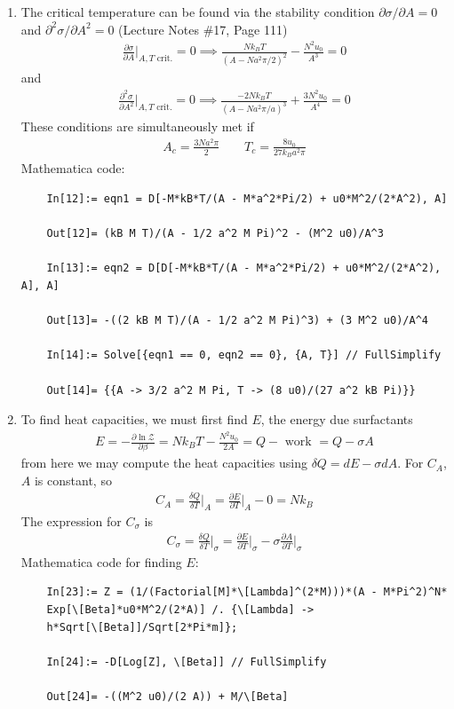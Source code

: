 \documentclass{article}
\theoremstyle{definition}
\newcommand{\p}{\partial}
\newcommand{\be}{\beta}
\newcommand{\f}[2]{\frac{#1}{#2}}
\newcommand{\lp}{\left(}
\newcommand{\rp}{\right)}
\begin{document}
\begin{enumerate}[label=(\alph*)]
	
	
	\item The critical temperature can be found via the stability condition $\p \sigma / \p A = 0$ and $\p^2 \sigma/ \p A^2 = 0$ (Lecture Notes \#17, Page 111)
	\begin{align*}
	\f{\p \sigma}{\p A}\bigg\vert_{A,T \text{ crit.}} = 0 \implies \f{N k_B T}{ \lp A - N a^2 \pi/2 \rp^2} - \f{N^2 u_0}{A^3} = 0
	\end{align*}
	and 
	\begin{align*}
	\f{\p^2 \sigma}{\p A^2}\bigg\vert_{A,T \text{ crit.}}  = 0 \implies \f{-2 N k_BT}{ \lp A -  N a^2 \pi/a \rp^3} + \f{3 N^2 u_0}{A^4} = 0 
	\end{align*}
	These conditions are simultaneously met if 
	\begin{align*}
	\boxed{A_c = \f{3N a^2 \pi}{2} \quad\quad T_c = \f{8 u_0}{27 k_B a^2 \pi} }
	\end{align*}
	Mathematica code:
	\begin{lstlisting}
	In[12]:= eqn1 = D[-M*kB*T/(A - M*a^2*Pi/2) + u0*M^2/(2*A^2), A]
	
	Out[12]= (kB M T)/(A - 1/2 a^2 M Pi)^2 - (M^2 u0)/A^3
	
	In[13]:= eqn2 = D[D[-M*kB*T/(A - M*a^2*Pi/2) + u0*M^2/(2*A^2), A], A]
	
	Out[13]= -((2 kB M T)/(A - 1/2 a^2 M Pi)^3) + (3 M^2 u0)/A^4
	
	In[14]:= Solve[{eqn1 == 0, eqn2 == 0}, {A, T}] // FullSimplify
	
	Out[14]= {{A -> 3/2 a^2 M Pi, T -> (8 u0)/(27 a^2 kB Pi)}}
	\end{lstlisting}
	
	
	
	\item To find heat capacities, we must first find $E$, the energy due surfactants
	\begin{align*}
	E = -\f{\p \ln \mathcal{Z}}{\p \be} = N k_B T - \f{N^2 u_0}{2A} = Q - \text{ work } = Q - \sigma A 
	\end{align*}
	from here we may compute the heat capacities using $\delta Q = d E - \sigma d A$. For $C_A$, $A$ is constant, so
	\begin{align*}
	\boxed{C_A = \f{\delta Q}{\delta T}\bigg\vert_{A}  = \f{\p E}{\p T}\bigg\vert_{A} - 0  = N k_B}
	\end{align*}
	The expression for $C_\sigma$ is 
	\begin{align*}
	\boxed{C_\sigma = \f{\delta Q}{ \delta T}\bigg\vert_{\sigma} = \f{\p E}{\p T}\bigg\vert_\sigma - \sigma \f{\p A}{\p T}\bigg\vert_{\sigma}}
	\end{align*}
	Mathematica code for finding $E$:
	\begin{lstlisting}
	In[23]:= Z = (1/(Factorial[M]*\[Lambda]^(2*M)))*(A - M*Pi^2)^N*
	Exp[\[Beta]*u0*M^2/(2*A)] /. {\[Lambda] -> 
	h*Sqrt[\[Beta]]/Sqrt[2*Pi*m]};
	
	In[24]:= -D[Log[Z], \[Beta]] // FullSimplify
	
	Out[24]= -((M^2 u0)/(2 A)) + M/\[Beta]
	\end{lstlisting}
\end{enumerate}
\end{document}
